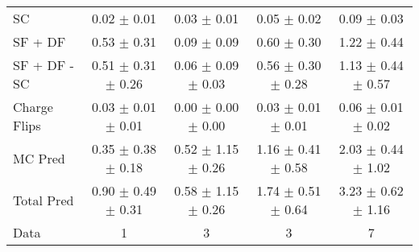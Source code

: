 \begin{tabular}{l|cccc}
                                 SC &  0.02 $\pm$  0.01 &  0.03 $\pm$  0.01 &  0.05 $\pm$  0.02 &  0.09 $\pm$  0.03 \\
                            SF + DF &  0.53 $\pm$  0.31 &  0.09 $\pm$  0.09 &  0.60 $\pm$  0.30 &  1.22 $\pm$  0.44 \\
\hline
                       SF + DF - SC &  0.51 $\pm$  0.31 $\pm$  0.26 &  0.06 $\pm$  0.09 $\pm$  0.03 &  0.56 $\pm$  0.30 $\pm$  0.28 &  1.13 $\pm$  0.44 $\pm$  0.57 \\
\hline\hline
                       Charge Flips &  0.03 $\pm$  0.01 $\pm$  0.01 &  0.00 $\pm$  0.00 $\pm$  0.00 &  0.03 $\pm$  0.01 $\pm$  0.01 &  0.06 $\pm$  0.01 $\pm$  0.02 \\
\hline
                            MC Pred &  0.35 $\pm$  0.38 $\pm$  0.18 &  0.52 $\pm$  1.15 $\pm$  0.26 &  1.16 $\pm$  0.41 $\pm$  0.58 &  2.03 $\pm$  0.44 $\pm$  1.02 \\
\hline
                         Total Pred &  0.90 $\pm$  0.49 $\pm$  0.31 &  0.58 $\pm$  1.15 $\pm$  0.26 &  1.74 $\pm$  0.51 $\pm$  0.64 &  3.23 $\pm$  0.62 $\pm$  1.16 \\
\hline\hline
                               Data &     1 &     3 &     3 &     7 \\
\hline\hline
\end{tabular}


